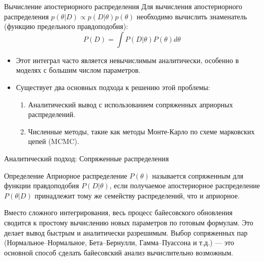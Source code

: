 \documentclass[notheorems, handout]{beamer}
\begin{document}
\begin{frame}{Вычисление апостериорного распределения}
  Для вычисления апостериорного распределения $p(\theta|D) \propto
  p(D|\theta)p(\theta)$ необходимо вычислить знаменатель (функцию
  предельного правдоподобия):
  \begin{equation*}
    P(D) = \int P(D | \theta) P(\theta) d\theta
  \end{equation*}
  \begin{itemize}
    \item Этот интеграл часто является невычислимым аналитически,
      особенно в моделях с большим числом параметров.
    \item Существует два основных подхода к решению этой проблемы:
      \begin{enumerate}
        \item Аналитический вывод с использованием сопряженных
          априорных распределений.
        \item Численные методы, такие как методы Монте-Карло по схеме
          марковских цепей (MCMC).
      \end{enumerate}
  \end{itemize}
\end{frame}

\begin{frame}{Аналитический подход: Сопряженные распределения}
  \begin{block}{Определение}
    Априорное распределение $P(\theta)$ называется сопряженным для
    функции правдоподобия $P(D|\theta)$, если получаемое
    апостериорное распределение $P(\theta|D)$ принадлежит тому же
    семейству распределений, что и априорное.
  \end{block}
  Вместо сложного интегрирования, весь процесс байесовского
  обновления сводится к простому вычислению новых параметров по
  готовым формулам. Это делает вывод быстрым и аналитически
  разрешимым. Выбор сопряженных пар (Нормальное--Нормальное,
  Бета--Бернулли, Гамма--Пуассона и т.д.) --- это основной способ
  сделать байесовский анализ вычислительно возможным.

\end{frame}
\end{document}
